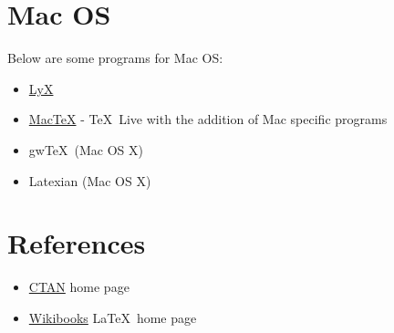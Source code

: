 \documentclass[12pt]{report}
\begin{document}
\section{Mac OS}
Below are some programs for Mac OS:\@
\begin{itemize}
\item \href{http://www.lyx.org/}{LyX}
\item\href{http://www.tug.org/mactex/}{Mac\TeX}
\subitem- \TeX\ Live with the addition of Mac specific programs
\item gw\TeX\   (Mac OS X)
\item Latexian (Mac OS X)
\end{itemize}

\section{References}
\label{sec:refs}
\begin{itemize}
\item \href{http://www.ctan.org}{CTAN} home page
\item \href{http://en.wikibooks.org/wiki/LaTeX/}{Wikibooks} \LaTeX\ home page
\end{itemize}


%
%
\clearpage {}\ %
\renewcommand\baselinestretch{1.0}


%
\begin{appendices}
\ %

\

\end{appendices}
%
%
%
\end{document}
